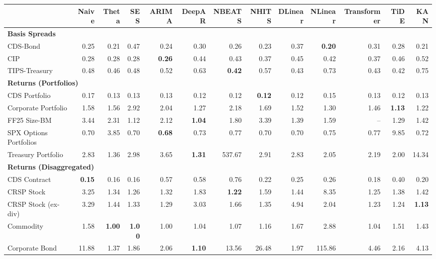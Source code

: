 \scriptsize
\setlength{\tabcolsep}{1.5pt}
\renewcommand{\arraystretch}{0.9}
\begin{tabular}{@{}lrrrrrrrrrrrr@{}}
\toprule
 & Naive & Theta & SES & ARIMA & DeepAR & NBEATS & NHITS & DLinear & NLinear & Transformer & TiDE & KAN \\
\midrule
\multicolumn{13}{l}{\textbf{Basis Spreads}} \\
CDS-Bond & 0.25 & 0.21 & 0.47 & 0.24 & 0.30 & 0.26 & 0.23 & 0.37 & \textbf{0.20} & 0.31 & 0.28 & 0.21 \\
CIP & 0.28 & 0.28 & 0.28 & \textbf{0.26} & 0.44 & 0.43 & 0.37 & 0.45 & 0.42 & 0.37 & 0.46 & 0.52 \\
TIPS-Treasury & 0.48 & 0.46 & 0.48 & 0.52 & 0.63 & \textbf{0.42} & 0.57 & 0.43 & 0.73 & 0.43 & 0.42 & 0.75 \\
\midrule
\multicolumn{13}{l}{\textbf{Returns (Portfolios)}} \\
CDS Portfolio & 0.17 & 0.13 & 0.13 & 0.13 & 0.12 & 0.12 & \textbf{0.12} & 0.12 & 0.15 & 0.13 & 0.12 & 0.13 \\
Corporate Portfolio & 1.58 & 1.56 & 2.92 & 2.04 & 1.27 & 2.18 & 1.69 & 1.52 & 1.30 & 1.46 & \textbf{1.13} & 1.22 \\
FF25 Size-BM & 3.44 & 2.31 & 1.12 & 2.12 & \textbf{1.04} & 1.80 & 3.39 & 1.39 & 1.59 & -- & 1.29 & 1.42 \\
SPX Options Portfolios & 0.70 & 3.85 & 0.70 & \textbf{0.68} & 0.73 & 0.77 & 0.70 & 0.70 & 0.75 & 0.77 & 9.85 & 0.72 \\
Treasury Portfolio & 2.83 & 1.36 & 2.98 & 3.65 & \textbf{1.31} & 537.67 & 2.91 & 2.83 & 2.05 & 2.19 & 2.00 & 14.34 \\
\midrule
\multicolumn{13}{l}{\textbf{Returns (Disaggregated)}} \\
CDS Contract & \textbf{0.15} & 0.16 & 0.16 & 0.57 & 0.58 & 0.76 & 0.22 & 0.25 & 0.26 & 0.18 & 0.40 & 0.20 \\
CRSP Stock & 3.25 & 1.34 & 1.26 & 1.32 & 1.83 & \textbf{1.22} & 1.59 & 1.44 & 8.35 & 1.25 & 1.38 & 1.42 \\
CRSP Stock (ex-div) & 3.29 & 1.44 & 1.33 & 1.29 & 3.03 & 1.66 & 1.35 & 4.94 & 2.04 & 1.23 & 1.24 & \textbf{1.13} \\
Commodity & 1.58 & \textbf{1.00} & \textbf{1.00} & 1.00 & 1.04 & 1.07 & 1.16 & 1.67 & 2.88 & 1.04 & 1.51 & 1.43 \\
Corporate Bond & 11.88 & 1.37 & 1.86 & 2.06 & \textbf{1.10} & 13.56 & 26.48 & 1.97 & 115.86 & 4.46 & 2.16 & 4.13 \\

\end{tabular}
